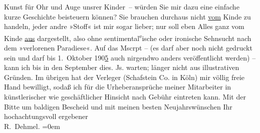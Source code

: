 \begin{ledgroupsized}[t]{13cm}
               Kunst für Ohr und Auge unsrer Kinder –\pend
           \pstart
           \noindent{}{\pb}würden Sie mir dazu eine einfache kurze Geschichte
               beisteuern können? Sie brauchen durchaus nicht \uline{vom}
               Kinde zu handeln, jeder andre »Stoff« ist mir sogar lieber; nur soll eben Alles ganz
               vom Kinde \uline{aus} dargestellt, also ohne sentimental\substVorne{}\textsuperscript{e}\substDazwischen{}ische\substHinten{} oder ironische Sehnsucht nach dem »verlorenen Paradiese«. Auf das Mscrpt –
               (es darf aber noch nicht gedruckt sein und darf bis 1. Oktober 190\uline{5} auch nirgendwo anders veröffentlicht werden) – kann ich bis in den
                  September dies. Js. warten; länger {\pb}nicht
               aus illustrativen Gründen. Im übrigen hat der Verleger (Schafstein {\kaufmannsund} Co. in Köln) mir völlig freie Hand bewilligt, sodaß ich
               für die Urheberansprüche meiner Mitarbeiter in künstlerischer wie geschäftlicher
               Hinsicht nach Gebühr eintreten kann.\pend
           \pstart
           Mit der Bitte um baldigen Bescheid und mit meinen besten Neujahrswünschen\pend
           \pstart
           Ihr hochachtungsvoll ergebener{\\[\baselineskip]}\spacefill\mbox{R. Dehmel.}\pend
           \leftskip=0em{}
         
         \endnumbering{}\end{ledgroupsized}  \newcommand{\dateiname}{L01194}\newcommand{\titel}{Richard Dehmel an Arthur Schnitzler, 1. 1. 1902}\newcommand{\editorInnen}{ Martin Anton Müller und Gerd-Hermann Susen}
      